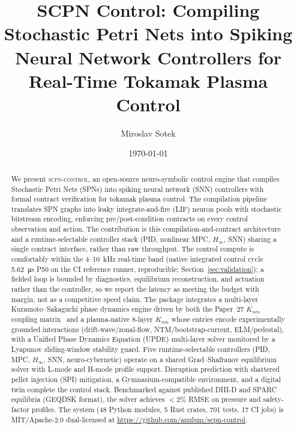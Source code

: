\documentclass[twocolumn,preprintnumbers,amsmath,amssymb,prl,floatfix]{revtex4-2}
\begin{document}
\title{SCPN Control: Compiling Stochastic Petri Nets into Spiking Neural
  Network Controllers for Real-Time Tokamak Plasma Control}

\author{Miroslav Sotek}


\date{\today}

\begin{abstract}
We present \textsc{scpn-control}, an open-source neuro-symbolic control engine
that compiles Stochastic Petri Nets (SPNs) into spiking neural network (SNN)
controllers with formal contract verification for tokamak plasma control.
The compilation pipeline translates SPN graphs into leaky integrate-and-fire
(LIF) neuron pools with stochastic bitstream encoding, enforcing
pre/post-condition contracts on every control observation and action.
The contribution is this compilation-and-contract architecture and a
runtime-selectable controller stack (PID, nonlinear MPC, $H_\infty$, SNN) sharing
a single contract interface, rather than raw throughput. The control compute is
comfortably within the 4--10~kHz real-time band (native integrated control cycle
\SI{5.62}{\micro\second} P50 on the CI reference runner, reproducible;
Section~\ref{sec:validation}); a fielded loop is bounded by diagnostics,
equilibrium reconstruction, and actuation rather than the controller, so we report
the latency as meeting the budget with margin, not as a competitive speed claim.
The package integrates a multi-layer Kuramoto--Sakaguchi phase dynamics engine
driven by both the Paper~27 $K_{nm}$ coupling matrix~\cite{sotek2026knm} and a
plasma-native 8-layer $K_{nm}$ whose entries encode experimentally grounded
interactions (drift-wave/zonal-flow, NTM/bootstrap-current, ELM/pedestal), with
a Unified Phase Dynamics Equation (UPDE) multi-layer solver monitored by a
Lyapunov sliding-window stability guard.
Five runtime-selectable controllers (PID, MPC, $H_\infty$, SNN,
neuro-cybernetic) operate on a shared Grad--Shafranov equilibrium solver
with L-mode and H-mode profile support.
Disruption prediction with shattered pellet injection (SPI) mitigation,
a Gymnasium-compatible environment, and a digital twin complete the
control stack.
Benchmarked against published DIII-D and SPARC equilibria (GEQDSK format),
the solver achieves $<2\%$ RMSE on pressure and safety-factor profiles.
The system (48 Python modules, 5 Rust crates, 701 tests, 17 CI jobs) is
MIT/Apache-2.0 dual-licensed at
\url{https://github.com/anulum/scpn-control}.
\end{abstract}
\end{document}
